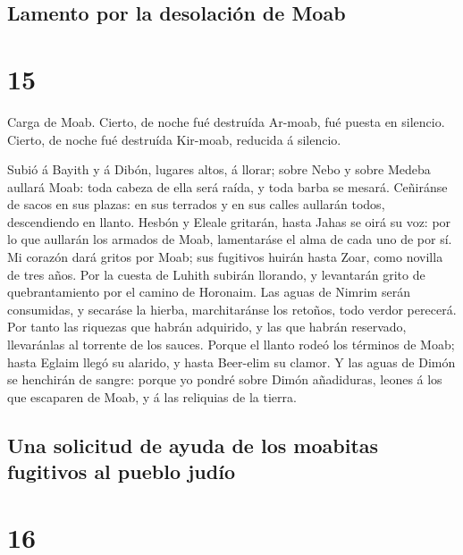 \hypertarget{lamento-por-la-desolaciuxf3n-de-moab}{%
\subsection{Lamento por la desolación de
Moab}\label{lamento-por-la-desolaciuxf3n-de-moab}}

\hypertarget{section-23-15}{%
\section{15}\label{section-23-15}}

 Carga de Moab. Cierto, de noche fué destruída Ar-moab,
fué puesta en silencio. Cierto, de noche fué destruída Kir-moab,
reducida á silencio.

 Subió á Bayith y á Dibón, lugares altos, á llorar; sobre
Nebo y sobre Medeba aullará Moab: toda cabeza de ella será raída, y toda
barba se mesará.  Ceñiránse de sacos en sus plazas: en sus
terrados y en sus calles aullarán todos, descendiendo en llanto.
 Hesbón y Eleale gritarán, hasta Jahas se oirá su voz: por
lo que aullarán los armados de Moab, lamentaráse el alma de cada uno de
por sí.  Mi corazón dará gritos por Moab; sus fugitivos
huirán hasta Zoar, como novilla de tres años. Por la cuesta de Luhith
subirán llorando, y levantarán grito de quebrantamiento por el camino de
Horonaim.  Las aguas de Nimrim serán consumidas, y
secaráse la hierba, marchitaránse los retoños, todo verdor perecerá.
 Por tanto las riquezas que habrán adquirido, y las que
habrán reservado, llevaránlas al torrente de los sauces. 
Porque el llanto rodeó los términos de Moab; hasta Eglaim llegó su
alarido, y hasta Beer-elim su clamor.  Y las aguas de
Dimón se henchirán de sangre: porque yo pondré sobre Dimón añadiduras,
leones á los que escaparen de Moab, y á las reliquias de la tierra.

\hypertarget{una-solicitud-de-ayuda-de-los-moabitas-fugitivos-al-pueblo-juduxedo}{%
\subsection{Una solicitud de ayuda de los moabitas fugitivos al pueblo
judío}\label{una-solicitud-de-ayuda-de-los-moabitas-fugitivos-al-pueblo-juduxedo}}

\hypertarget{section-23-16}{%
\section{16}\label{section-23-16}}


